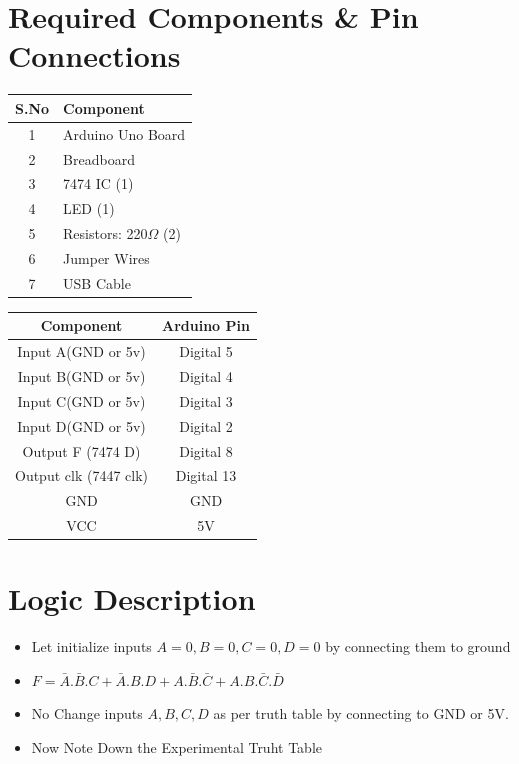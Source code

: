 \documentclass[a4paper,12pt]{article}
\begin{document}
\section*{Required Components \& Pin Connections}
\begin{center}
\begin{minipage}{0.45\textwidth}
\begin{table}[H]
\centering
\begin{tabular}{|c|l|}
\hline
\textbf{S.No} & \textbf{Component} \\ \hline
1 & Arduino Uno Board \\
2 & Breadboard \\
3 & 7474 IC (1) \\
4 & LED (1) \\
5 & Resistors: 220$\Omega$ (2) \\
6 & Jumper Wires \\
7 & USB Cable \\
\hline
\end{tabular}
\end{table}
\end{minipage}
\hspace{0.05\textwidth}
\begin{minipage}{0.45\textwidth}
\begin{table}[H]
\centering
\begin{tabular}{|c|c|}
\hline
\textbf{Component} & \textbf{Arduino Pin} \\ \hline
Input A(GND or 5v) & Digital 5 \\
Input B(GND or 5v) & Digital 4 \\
Input C(GND or 5v) & Digital 3 \\
Input D(GND or 5v) & Digital 2 \\
Output F (7474 D) & Digital 8 \\
Output clk (7447 clk) & Digital 13 \\
GND & GND \\
VCC & 5V \\
\hline
\end{tabular}
\end{table}
\end{minipage}
\end{center}
\section*{Logic Description}
\begin{itemize}
        \item Let initialize inputs $A=0,B=0,C=0,D=0$ by connecting them to ground
        \item $F = \bar{A}.\bar{B}.C + \bar{A}.B.D + A.\bar{B}.\bar{C} + A.B.\bar{C}.\bar{D} $
	\item No Change inputs $A,B,C,D$ as per truth table by connecting to GND or 5V.
	\item Now Note Down the Experimental Truht Table
\end{itemize}
\end{document}
